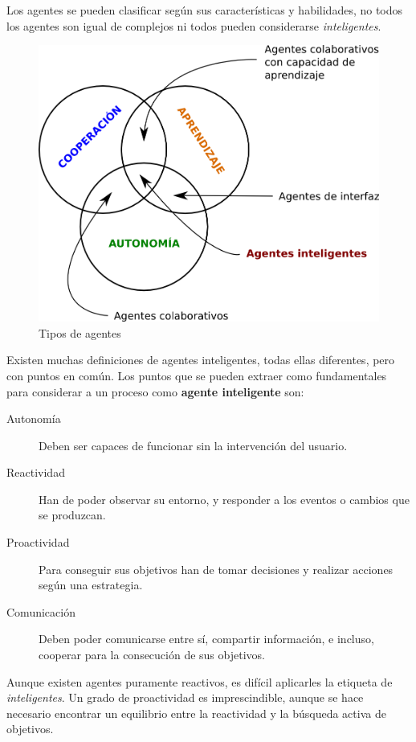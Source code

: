 Los agentes se pueden clasificar según sus características y habilidades, no
todos los agentes son igual de complejos ni todos pueden considerarse {\em
inteligentes}.

\begin{figure}[H]
 \centering
 \includegraphics[width=120mm]{figuras/cap1/tipos_agentes.png}
 \caption{Tipos de agentes}
\end{figure}

Existen muchas definiciones de agentes inteligentes, todas ellas diferentes,
pero con puntos en común. Los puntos que se pueden extraer como fundamentales
para considerar a un proceso como {\bf agente inteligente} son:

\begin{description}
 \item[Autonomía]Deben ser capaces de funcionar sin la intervención del usuario.
 \item[Reactividad]Han de poder observar su entorno, y responder a los eventos
 o cambios que se produzcan.
 \item[Proactividad]Para conseguir sus objetivos han de tomar decisiones y
 realizar acciones según una estrategia.
 \item[Comunicación]Deben poder comunicarse entre sí, compartir información, e
 incluso, cooperar para la consecución de sus objetivos.
\end{description}

Aunque existen agentes puramente reactivos, es difícil aplicarles la etiqueta
de {\em inteligentes}. Un grado de proactividad es imprescindible, aunque se
hace necesario encontrar un equilibrio entre la reactividad y la búsqueda
activa de objetivos.

